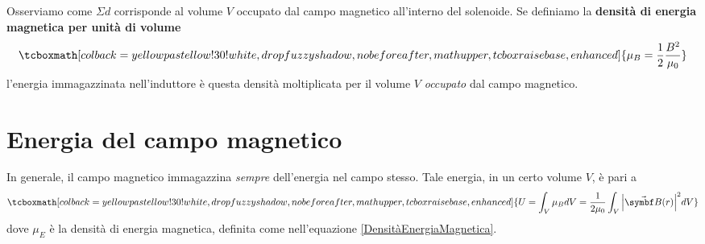 Osserviamo come $\Sigma d$ corrisponde al volume $V$ occupato dal campo magnetico all'interno del solenoide. Se definiamo la \textbf{densità di energia magnetica per unità di volume}
\begin{equation}\label{DensitàEnergiaMagnetica}
	\tcboxmath[colback=yellowpastellow!30!white,drop fuzzy shadow, nobeforeafter, math upper, tcbox raise base, enhanced]{\mu_{B}=\frac{1}{2}\frac{B^2}{\mu_0}}
\end{equation}
l'energia immagazzinata nell'induttore è questa densità moltiplicata per il volume $V$ \textit{occupato} dal campo magnetico.
\section{Energia del campo magnetico}
In generale, il campo magnetico immagazzina \textit{sempre} dell'energia nel campo stesso. Tale energia, in un certo volume $V$, è pari a
\begin{equation}
	\tcboxmath[colback=yellowpastellow!30!white,drop fuzzy shadow, nobeforeafter, math upper, tcbox raise base, enhanced]{U=\int_V\mu_BdV=\frac{1}{2\mu_0}\int_V\abs{\vba{B}(r)}^2dV}
\end{equation}
dove $\mu_E$ è la densità di energia magnetica, definita come nell'equazione \eqref{DensitàEnergiaMagnetica}.
